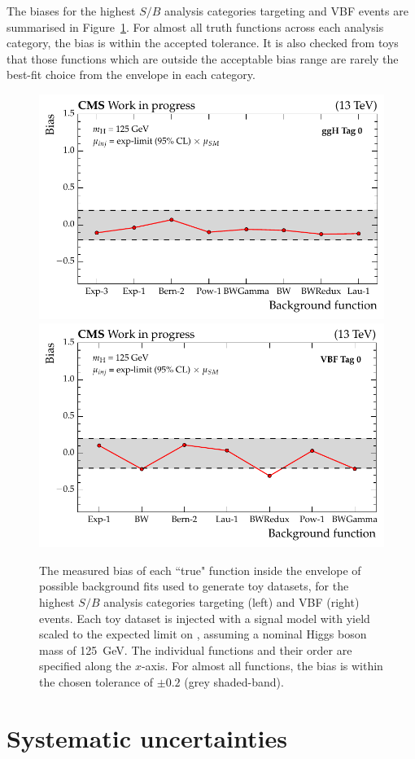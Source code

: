 The biases for the highest $S/B$ analysis categories targeting \ggH and VBF events are summarised in Figure~\ref{fig:hee_per_category_pulls}.
For almost all truth functions across each analysis category, the bias is within the accepted tolerance.
It is also checked from toys that those functions which are outside the acceptable bias range 
are rarely the best-fit choice from the envelope in each category.

\begin{figure}[htbp!]
\centering
\includegraphics[width =0.49\linewidth]{Figures/Hee/Results/biasStudies/pulls_gghcat0.pdf}
\includegraphics[width =0.49\linewidth]{Figures/Hee/Results/biasStudies/pulls_vbfcat0.pdf}
\caption[The bias for each background candidate function in the envelope for the \ggH Tag 0 and VBF Tag 0 analysis categories.]{The measured bias of each ``true" function inside the envelope of possible background fits used to generate toy datasets, for the highest $S/B$ analysis categories targeting \ggH (left) and VBF (right) events. Each toy dataset is injected with a signal model with yield scaled to the expected limit on \BHee, assuming a nominal Higgs boson mass of 125~GeV. The individual functions and their order are specified along the $x$-axis. For almost all functions, the bias is within the chosen tolerance of $\pm0.2$ (grey shaded-band).}
\label{fig:hee_per_category_pulls}                                                                                 
\end{figure}


\section{Systematic uncertainties}
\label{subsec:hee_syst_uncertainties}

